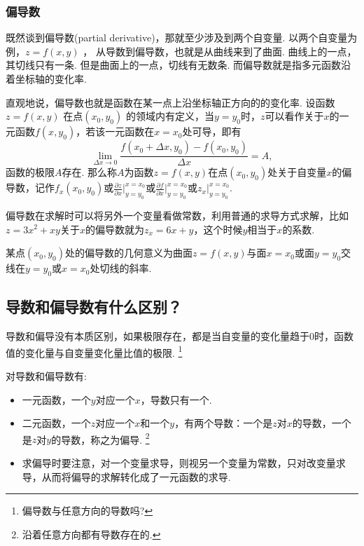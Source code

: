 \subsubsection{偏导数}
\label{sec:2.1.2}
既然谈到偏导数(partial derivative)，那就至少涉及到两个自变量.
以两个自变量为例，\(z=f(x,y)​\) ， 从导数到偏导数，也就是从曲线来到了曲面.
曲线上的一点，其切线只有一条.
但是曲面上的一点，切线有无数条.
而偏导数就是指多元函数沿着坐标轴的变化率.
\begin{note}
直观地说，偏导数也就是函数在某一点上沿坐标轴正方向的的变化率.
设函数\(z=f(x,y)​\) 在点\((x_0,y_0)​\) 的领域内有定义，当\(y=y_0​\)时，\(z​\)可以看作关于\(x​\)的一元函数\(f(x,y_0)​\)，若该一元函数在\(x=x_0​\)处可导，即有
\[
\lim_{\Delta x \to 0}{\frac{f(x_0+\Delta x,y_0)-f(x_0,y_0)}{\Delta x}}=A,
\]
函数的极限\(A\)存在.
那么称\(A\)为函数\(z=f(x,y)\)在点\((x_0,y_0)\)处关于自变量\(x\)的偏导数，记作\(f_x(x_0,y_0)\)或\(\frac{\partial z}{\partial x}\vert_{y=y_0}^{x=x_0}\)或\(\frac{\partial f}{\partial x}\vert_{y=y_0}^{x=x_0}\)或\(z_x\vert_{y=y_0}^{x=x_0}\).

偏导数在求解时可以将另外一个变量看做常数，利用普通的求导方式求解，比如\(z=3x^2+xy\)关于\(x\)的偏导数就为\(z_x=6x+y\)，这个时候\(y\)相当于\(x\)的系数.

某点\((x_0,y_0)\)处的偏导数的几何意义为曲面\(z=f(x,y)\)与面\(x=x_0\)或面\(y=y_0\)交线在\(y=y_0\)或\(x=x_0\)处切线的斜率.
\end{note}
\subsection{导数和偏导数有什么区别？}\label{ux5bfcux6570ux548cux504fux5bfcux6570ux6709ux4ec0ux4e48ux533aux522b}
导数和偏导没有本质区别，如果极限存在，都是当自变量的变化量趋于0时，函数值的变化量与自变量变化量比值的极限.
\footnote{偏导数与任意方向的导数吗?}

\begin{remark}
  对导数和偏导数有:
\begin{itemize}
\item  一元函数，一个\(y\)对应一个\(x\)，导数只有一个.
\item  二元函数，一个\(z\)对应一个\(x\)和一个\(y\)，有两个导数：一个是\(z\)对\(x\)的导数，一个是\(z\)对\(y\)的导数，称之为偏导.
  \footnote{沿着任意方向都有导数存在的.}
\item  求偏导时要注意，对一个变量求导，则视另一个变量为常数，只对改变量求导，从而将偏导的求解转化成了一元函数的求导.
\end{itemize}
\end{remark}

